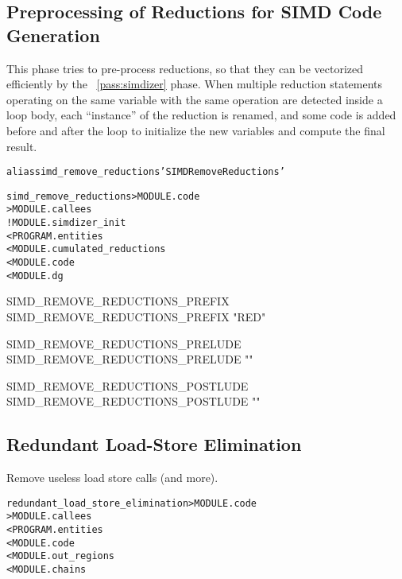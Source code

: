 \documentclass[a4paper]{report}
\newenvironment{PipsMake}{\begin{alltt}}{\end{alltt}}
\newcommand{\PipsPassRef}[1]{\texttt{\detokenize{#1}}~\ref{pass:#1}}
\newenvironment{PipsPass}[1]{\label{pass:#1}}{}
\begin{document}
\subsection{Preprocessing of Reductions for SIMD Code Generation}

\begin{PipsPass}{simd_remove_reductions}
This phase tries to pre-process reductions, so that they can be
vectorized efficiently by the \PipsPassRef{simdizer} phase. When multiple
reduction statements operating on the same variable with the same
operation are detected inside a loop body, each ``instance'' of the
reduction is renamed, and some code is added before and after the loop
to initialize the new variables and compute the final result.
\end{PipsPass}

\begin{PipsMake}
alias simd_remove_reductions 'SIMD Remove Reductions'

simd_remove_reductions      > MODULE.code
                            > MODULE.callees
        ! MODULE.simdizer_init
        < PROGRAM.entities
        < MODULE.cumulated_reductions
        < MODULE.code
        < MODULE.dg
\end{PipsMake}
\begin{PipsProp}{SIMD_REMOVE_REDUCTIONS_PREFIX}
SIMD_REMOVE_REDUCTIONS_PREFIX "RED"
\end{PipsProp}
\begin{PipsProp}{SIMD_REMOVE_REDUCTIONS_PRELUDE}
SIMD_REMOVE_REDUCTIONS_PRELUDE ""
\end{PipsProp}
\begin{PipsProp}{SIMD_REMOVE_REDUCTIONS_POSTLUDE}
SIMD_REMOVE_REDUCTIONS_POSTLUDE ""
\end{PipsProp}

\subsection{Redundant Load-Store Elimination}

\begin{PipsPass}{redundant_load_store_elimination}
Remove useless load store calls (and more).
\end{PipsPass}

\begin{PipsMake}

redundant_load_store_elimination      > MODULE.code
		> MODULE.callees
        < PROGRAM.entities
        < MODULE.code
        < MODULE.out_regions
        < MODULE.chains
\end{PipsMake}
\end{document}
